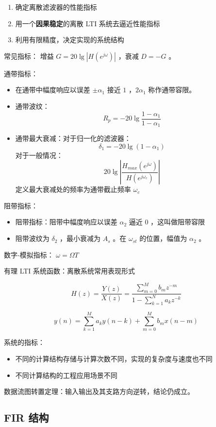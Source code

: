 \documentclass[cn,11pt,chinese,black,simple]{elegantbook}
\begin{document}
\begin{enumerate}
    \item 确定离散滤波器的性能指标
    \item 用一个\textbf{因果稳定}的离散 LTI 系统去逼近性能指标
    \item 利用有限精度，决定实现的系统结构
\end{enumerate}

常见指标： 增益 \(G = 20 \lg |H(e^{j\omega})|\) ，衰减 \(D = - G\) 。

通带指标：

\begin{itemize}
    \item 在通带中幅度响应以误差 \(\pm \alpha_1\) 接近 \(1\) ，\(2 \alpha_1\) 称作通带容限。
    \item 通带波纹： \[R_p = -20 \lg \frac{1-\alpha_1}{1-\alpha_1}\]
    \item 通带最大衰减：对于归一化的滤波器：\[\delta_1 = -20 \lg (1-\alpha_1)\] 对于一般情况：\[20 \lg \left|\frac{H_{max}(e^{j\omega})}{H(e^{j\omega_c})}\right|\] 定义最大衰减处的频率为通带截止频率 \(\omega_c\) 
\end{itemize}

阻带指标：

\begin{itemize}
    \item 阻带指标：阻带中幅度响应以误差 \(\alpha_2\) 逼近 \(0\) ，这叫做阻带容限 
    \item 阻带波纹为 \(\delta_2\) ，最小衰减为 \(A_s\) 。在 \(\omega_{st}\) 的位置，幅值为 \(\alpha_2\) 。
\end{itemize}

数字-模拟指标： \(\omega = \Omega T\)

有理 LTI 系统函数：离散系统常用表现形式

\[
H(z)=\frac{Y(z)}{X(z)}=\frac{\sum_{m=0}^{M} b_{m} z^{-m}}{1-\sum_{k=1}^{N} a_{k} z^{-k}}
\]

\[y(n)=\sum_{k=1}^{M} a_{k} y(n-k)+\sum_{m=0}^{M} b_{m} x(n-m)\] 

系统的指标：

\begin{itemize}
    \item 不同的计算结构存储与计算次数不同，实现的复杂度与速度也不同
    \item 不同计算结构的工程应用场景不同
\end{itemize}

数据流图转置定理：输入输出及其支路方向逆转，结论仍成立。

\subsection{FIR 结构}
\end{document}
